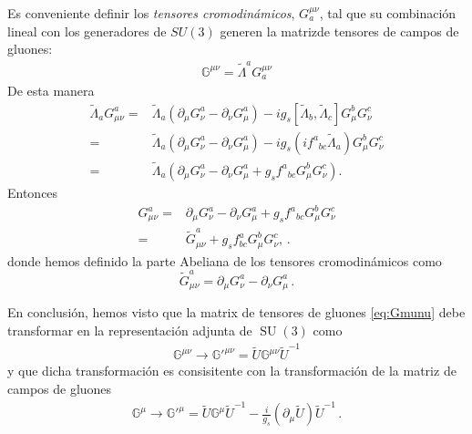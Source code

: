 \begin{frame}
Es conveniente definir los \emph{tensores cromodinámicos}, $G^{\mu\nu}_a$, tal que su combinación lineal con los generadores de $SU(3)$ generen la matrizde tensores de campos de gluones:
\begin{align}
\label{eq:Gmunu}
\mathbb{G}^{\mu\nu}=\widetilde{\Lambda}^aG^{\mu\nu}_a
\end{align}
De esta manera
\begin{align}
  \widetilde{\Lambda}_a G_{\mu\nu}^a=& \widetilde{\Lambda}_a
\left( \partial_{\mu}G_{\nu}^{a}-\partial_{\nu}G_{\mu}^{a}  \right)
-i g_s \left[ \widetilde{\Lambda}_b,\widetilde{\Lambda}_c \right]G_{\mu}^{b}G_{\nu}^{c} \nonumber\\
=&\widetilde{\Lambda}_a
\left( \partial_{\mu}G_{\nu}^{a}-\partial_{\nu}G_{\mu}^{a}  \right)
-i g_s \left(i {f^{a}}_{bc} \widetilde{\Lambda}_a \right)G_{\mu}^{b}G_{\nu}^{c} \nonumber\\
=&\widetilde{\Lambda}_a \left(  \partial_{\mu}G_{\nu}^{a}-\partial_{\nu}G_{\mu}^{a} 
+g_s  {f^{a}}_{bc} G_{\mu}^{b}G_{\nu}^{c}\right).
\end{align}
Entonces
\begin{align}
  \label{eq:258qft}
  G_{\mu\nu}^a=&\partial_{\mu}G_{\nu}^{a}-\partial_{\nu}G_{\mu}^{a}+
g_s{f^{a}}_{bc}G_{\mu}^{b}G_{\nu}^{c} \nonumber\\
=&\widetilde{G}_{\mu\nu}^a+g_s f^a_{bc}G_\mu^b G_\nu^c,\,.
\end{align}
donde hemos definido la parte Abeliana de los tensores cromodinámicos como
\begin{equation}
  \widetilde{G}_{\mu\nu}^a=\partial_\mu G_\nu^a-\partial_\nu G_\mu^a\,.
\end{equation}
\end{frame}


En conclusión, hemos visto que la matrix de tensores de gluones \eqref{eq:Gmunu} debe transformar en la representación adjunta de $\operatorname{SU}(3)$ como
\begin{align}
\label{eq:pGmunu}
  \mathbb{G}^{\mu\nu}\to  {\mathbb{G}'}^{\mu\nu}=\widetilde{U}  \mathbb{G}^{\mu\nu} \widetilde{U}^{-1}
\end{align}
y que dicha transformación es consisitente con la transformación de la matriz de campos de gluones
\begin{align}
  \mathbb{G}^{\mu}\to {\mathbb{G}'}^{\mu}= \widetilde{U} \mathbb{G}^{\mu} \widetilde{U}^{-1}
-\frac{i}{g_s} \left( \partial_{\mu} \widetilde{U} \right) \widetilde{U}^{-1}\,.
\end{align}

